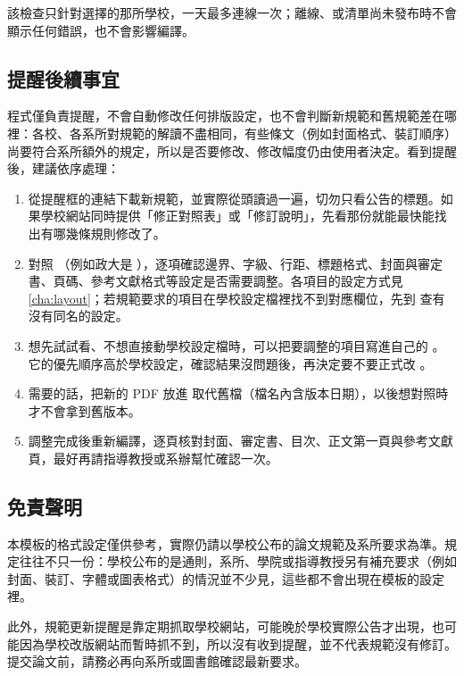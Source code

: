 該檢查只針對選擇的那所學校，一天最多連線一次；離線、或清單尚未發布時不會顯示任何錯誤，也不會影響編譯。

\subsection{提醒後續事宜}

程式僅負責提醒，不會自動修改任何排版設定，也不會判斷新規範和舊規範差在哪裡：各校、各系所對規範的解讀不盡相同，有些條文（例如封面格式、裝訂順序）尚要符合系所額外的規定，所以是否要修改、修改幅度仍由使用者決定。看到提醒後，建議依序處理：

\begin{enumerate}
\item 從提醒框的連結下載新規範，並實際從頭讀過一遍，切勿只看公告的標題。如果學校網站同時提供「修正對照表」或「修訂說明」，先看那份就能最快能找出有哪幾條規則修改了。
\item 對照 （例如政大是 ），逐項確認邊界、字級、行距、標題格式、封面與審定書、頁碼、參考文獻格式等設定是否需要調整。各項目的設定方式見\ref{cha:layout}；若規範要求的項目在學校設定檔裡找不到對應欄位，先到  查有沒有同名的設定。
\item 想先試試看、不想直接動學校設定檔時，可以把要調整的項目寫進自己的 。它的優先順序高於學校設定，確認結果沒問題後，再決定要不要正式改 。
\item 需要的話，把新的 PDF 放進  取代舊檔（檔名內含版本日期），以後想對照時才不會拿到舊版本。
\item 調整完成後重新編譯，逐頁核對封面、審定書、目次、正文第一頁與參考文獻頁，最好再請指導教授或系辦幫忙確認一次。
\end{enumerate}

\subsection{免責聲明}

本模板的格式設定僅供參考，實際仍請以學校公布的論文規範及系所要求為準。規定往往不只一份：學校公布的是通則，系所、學院或指導教授另有補充要求（例如封面、裝訂、字體或圖表格式）的情況並不少見，這些都不會出現在模板的設定裡。

此外，規範更新提醒是靠定期抓取學校網站，可能晚於學校實際公告才出現，也可能因為學校改版網站而暫時抓不到，所以沒有收到提醒，並不代表規範沒有修訂。提交論文前，請務必再向系所或圖書館確認最新要求。
